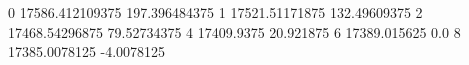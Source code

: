 0 17586.412109375 197.396484375
1 17521.51171875 132.49609375
2 17468.54296875 79.52734375
4 17409.9375 20.921875
6 17389.015625 0.0
8 17385.0078125 -4.0078125
